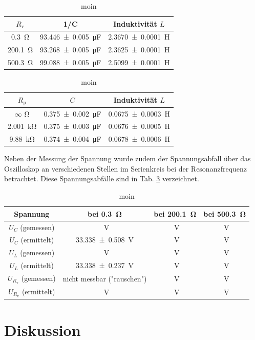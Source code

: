 	\begin{table}
		\caption{moin}
		\label{tab:L}
		\centering
		\begin{tabular}{c|c|c}
			$R_\text{v}$ & 1/C & Induktivität $L$ \\
			\hline
			\SI{0,3}{\ohm} & \SI{93,446+-0,005}{\micro\farad} & \SI{2,3670+-0,0001}{\henry} \\
			\SI{200,1}{\ohm} & \SI{93,268+-0,005}{\micro\farad} & \SI{2,3625+-0,0001}{\henry} \\ 
			\SI{500,3}{\ohm} & \SI{99,088+-0,005}{\micro\farad} & \SI{2,5099+-0,0001}{\henry} \\ 
		\end{tabular}
		\begin{tabular}{c|c|c}
			$R_\text{p}$ & $C$ & Induktivität $L$ \\
			\hline
			$\infty$ \si{\ohm} & \SI{0,375+-0,002}{\micro\farad} & \SI{0,0675+-0,0003}{\henry} \\
			\SI{2,001}{\kilo\ohm} & \SI{0,375+-0,003}{\micro\farad} & \SI{0,0676+-0,0005}{\henry} \\ 
			\SI{9,88}{\kilo\ohm} & \SI{0,374+-0,004}{\micro\farad} & \SI{0,0678+-0,0006}{\henry} \\
		\end{tabular}
	\end{table}
	Neben der Messung der Spannung wurde zudem der Spannungsabfall über das Oszilloskop an verschiedenen Stellen im Serienkreis bei der Resonanzfrequenz betrachtet.
	Diese Spannungsabfälle sind in Tab. \ref{tab:Abfall} verzeichnet. 
	\begin{table}
		\caption{moin}
		\label{tab:Abfall}
		\centering
		\begin{tabular}{c|c|c|c}
			Spannung & bei \SI{0,3}{\ohm} & bei \SI{200,1}{\ohm} & bei \SI{500,3}{\ohm}\\
			\hline
			$U_C$ (gemessen) & \SI{}{\volt} & \SI{}{\volt} & \SI{}{\volt} \\
			$U_C$ (ermittelt) & \SI{33,338+-0,508}{\volt} & \SI{}{\volt} & \SI{}{\volt} \\
			\hline
			$U_L$ (gemessen)  & \SI{}{\volt} & \SI{}{\volt} & \SI{}{\volt} \\
			$U_L$ (ermittelt)  & \SI{33,338+-0,237}{\volt} & \SI{}{\volt} & \SI{}{\volt} \\
			\hline
			$U_{R_\text{v}}$ (gemessen) & nicht messbar ("rauschen") & \SI{}{\volt}  & \SI{}{\volt} \\
			$U_{R_\text{v}}$ (ermittelt) & \SI{}{\volt} & \SI{}{\volt} & \SI{}{\volt} \\
		\end{tabular}
	\end{table}

\section{Diskussion}




